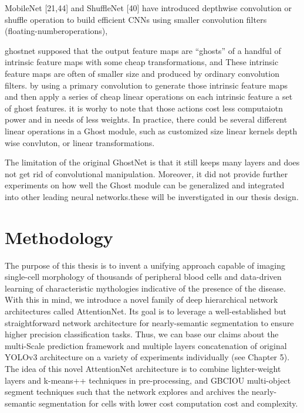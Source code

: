 MobileNet [21,44] and ShuffleNet [40] have introduced depthwise convolution or shuffle operation to build efficient CNNs  using  smaller  convolution  filters  (floating-numberoperations),

ghostnet supposed that the output feature maps are “ghosts” of a handful of intrinsic feature maps with some cheap transformations, and These intrinsic feature maps are often of smaller size and produced by ordinary convolution filters. by using a primary convolution to generate those intrinsic feature maps and then apply a series of cheap linear operations on each intrinsic feature a  set of ghost features. it is worhy to note that those actions cost less computaiotn power and in needs of less weights. In practice, there could be several different linear operations in a Ghost module, such as customized size linear kernels depth wise convluton, or linear transformations.




The limitation of the original GhostNet \cite{19} is that it still keeps many layers and does not get rid of convolutional manipulation. Moreover, it did not provide further experiments on how well the Ghost module can be generalized and integrated into other leading neural networks.these will be inverstigated in our thesis design.

































\chapter{Methodology}
\label{sec:Methodology}
The purpose of this thesis is to invent a unifying approach capable of imaging single-cell morphology of thousands of peripheral blood cells and data-driven learning of characteristic mythologies indicative of the presence of the disease. With this in mind, we introduce a novel family of deep hierarchical network architectures called AttentionNet. Its goal is to leverage a well-established but straightforward network architecture for nearly-semantic segmentation to ensure higher precision classification tasks. Thus, we can base our claims about the multi-Scale prediction framework and multiple layers concatenation of original YOLOv3 architecture on a variety of experiments individually (see Chapter 5). The idea of this novel AttentionNet architecture is to combine lighter-weight layers and k-means++ techniques in pre-processing, and GBCIOU multi-object segment techniques such that the network explores and archives the nearly-semantic segmentation for cells with lower cost computation cost and complexity.

